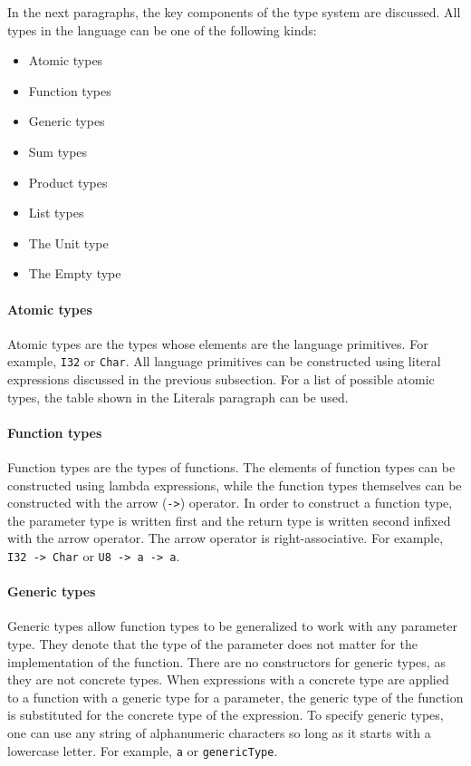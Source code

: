 \documentclass[12pt]{article}
\begin{document}
In the next paragraphs, the key components of the type system are discussed. All
types in the language can be one of the following kinds:
\begin{itemize}
    \item Atomic types
    \item Function types
    \item Generic types
    \item Sum types
    \item Product types
    \item List types
    \item The Unit type
    \item The Empty type
\end{itemize}

\paragraph{Atomic types} Atomic types are the types whose elements are the
language primitives. For example, \verb$I32$ or \verb$Char$. All language
primitives can be constructed using literal expressions discussed in the
previous subsection. For a list of possible atomic types, the table shown in the
Literals paragraph can be used.

\paragraph{Function types} Function types are the types of functions. The
elements of function types can be constructed using lambda expressions, while
the function types themselves can be constructed with the arrow (\verb$->$)
operator. In order to construct a function type, the parameter type is written
first and the return type is written second infixed with the arrow operator. The
arrow operator is right-associative. For example, \verb$I32 -> Char$ or 
\verb$U8 -> a -> a$.

\paragraph{Generic types} Generic types allow function types to be generalized
to work with any parameter type. They denote that the type of the parameter does
not matter for the implementation of the function. There are no constructors for
generic types, as they are not concrete types. When expressions with a concrete
type are applied to a function with a generic type for a parameter, the generic
type of the function is substituted for the concrete type of the expression. To
specify generic types, one can use any string of alphanumeric characters so long
as it starts with a lowercase letter. For example, \verb$a$ or
\verb$genericType$.
\end{document}
